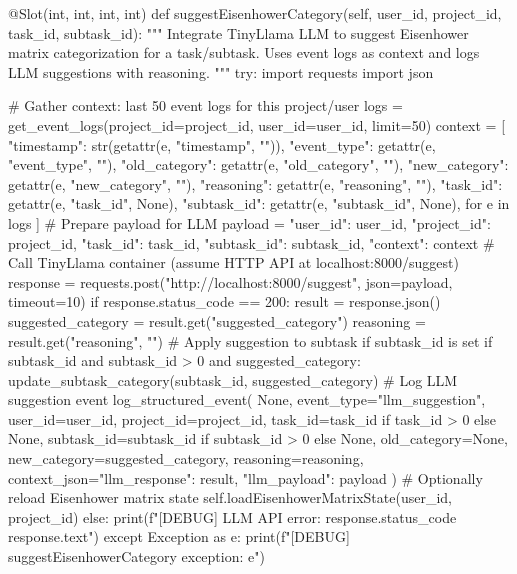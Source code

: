 \documentclass{report}
\begin{document}
\begin{python}
    @Slot(int, int, int, int)
    def suggestEisenhowerCategory(self, user_id, project_id, task_id, subtask_id):
        """
        Integrate TinyLlama LLM to suggest Eisenhower matrix categorization for a task/subtask.
        Uses event logs as context and logs LLM suggestions with reasoning.
        """
        try:
            import requests
            import json

            # Gather context: last 50 event logs for this project/user
            logs = get_event_logs(project_id=project_id, user_id=user_id, limit=50)
            context = [
                {
                    "timestamp": str(getattr(e, "timestamp", "")),
                    "event_type": getattr(e, "event_type", ""),
                    "old_category": getattr(e, "old_category", ""),
                    "new_category": getattr(e, "new_category", ""),
                    "reasoning": getattr(e, "reasoning", ""),
                    "task_id": getattr(e, "task_id", None),
                    "subtask_id": getattr(e, "subtask_id", None),
                }
                for e in logs
            ]
            # Prepare payload for LLM
            payload = {
                "user_id": user_id,
                "project_id": project_id,
                "task_id": task_id,
                "subtask_id": subtask_id,
                "context": context
            }
            # Call TinyLlama container (assume HTTP API at localhost:8000/suggest)
            response = requests.post("http://localhost:8000/suggest", json=payload, timeout=10)
            if response.status_code == 200:
                result = response.json()
                suggested_category = result.get("suggested_category")
                reasoning = result.get("reasoning", "")
                # Apply suggestion to subtask if subtask_id is set
                if subtask_id and subtask_id > 0 and suggested_category:
                    update_subtask_category(subtask_id, suggested_category)
                # Log LLM suggestion event
                log_structured_event(
                    None,
                    event_type="llm_suggestion",
                    user_id=user_id,
                    project_id=project_id,
                    task_id=task_id if task_id > 0 else None,
                    subtask_id=subtask_id if subtask_id > 0 else None,
                    old_category=None,
                    new_category=suggested_category,
                    reasoning=reasoning,
                    context_json={"llm_response": result, "llm_payload": payload}
                )
                # Optionally reload Eisenhower matrix state
                self.loadEisenhowerMatrixState(user_id, project_id)
            else:
                print(f"[DEBUG] LLM API error: {response.status_code} {response.text}")
        except Exception as e:
            print(f"[DEBUG] suggestEisenhowerCategory exception: {e}")



\end{python}
\end{document}
